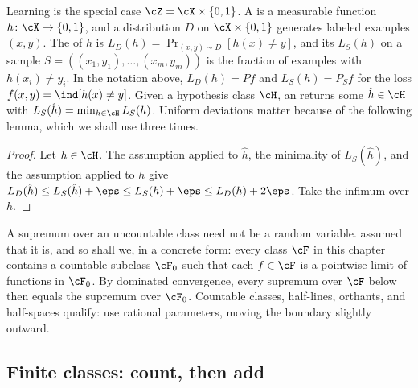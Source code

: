 \begin{refsection}
Learning is the special case $\cZ = \cX\times\{0,1\}$. A  is a measurable function $h\colon\cX\to\{0,1\}$, and a distribution $D$ on $\cX\times\{0,1\}$ generates labeled examples $(x,y)$. The  of $h$ is $L_D(h) = \Pr_{(x,y)\sim D}[h(x)\ne y]$, and its  $L_S(h)$ on a sample $S = ((x_1,y_1),\dots,(x_m,y_m))$ is the fraction of examples with $h(x_i)\ne y_i$. In the notation above, $L_D(h) = Pf$ and $L_S(h) = P_Sf$ for the loss $f(x,y) = \ind[h(x)\ne y]$. Given a hypothesis class $\cH$, an  returns some $\hat h\in\cH$ with $L_S(\hat h) = \min_{h\in\cH}L_S(h)$. Uniform deviations matter because of the following lemma, which we shall use three times.


\begin{proof}
Let $h\in\cH$. The assumption applied to $\hat h$, the minimality of $L_S(\hat h)$, and the assumption applied to $h$ give $L_D(\hat h)\le L_S(\hat h)+\eps\le L_S(h)+\eps\le L_D(h)+2\eps$. Take the infimum over $h$.
\end{proof}

\begin{aside}[Measurability]
A supremum over an uncountable class need not be a random variable. \textcite{VapnikChervonenkis1971} assumed that it is, and so shall we, in a concrete form: every class $\cF$ in this chapter contains a countable subclass $\cF_0$ such that each $f\in\cF$ is a pointwise limit of functions in $\cF_0$. By dominated convergence, every supremum over $\cF$ below then equals the supremum over $\cF_0$. Countable classes, half-lines, orthants, and half-spaces qualify: use rational parameters, moving the boundary slightly outward.
\end{aside}

\subsection{Finite classes: count, then add}\label{sec:vc:finite}


\end{refsection}
